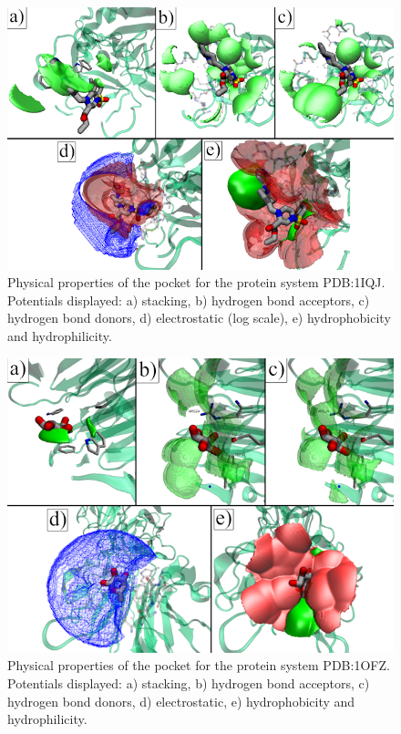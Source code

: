 \begin{figure}[H]
  \centering
  \includegraphics[width=1\textwidth]{figures/appendix/benchmark_prot/1iqj.png}
  \caption{\label{fig:appx_benchmark/1iqj} Physical properties of the pocket for the protein system PDB:1IQJ. Potentials displayed: a) stacking, b) hydrogen bond acceptors, c) hydrogen bond donors, d) electrostatic (log scale), e) hydrophobicity and hydrophilicity.}
\end{figure}

\begin{figure}[H]
  \centering
  \includegraphics[width=1\textwidth]{figures/appendix/benchmark_prot/1ofz.png}
  \caption{\label{fig:appx_benchmark/1ofz} Physical properties of the pocket for the protein system PDB:1OFZ. Potentials displayed: a) stacking, b) hydrogen bond acceptors, c) hydrogen bond donors, d) electrostatic, e) hydrophobicity and hydrophilicity.}
\end{figure}

